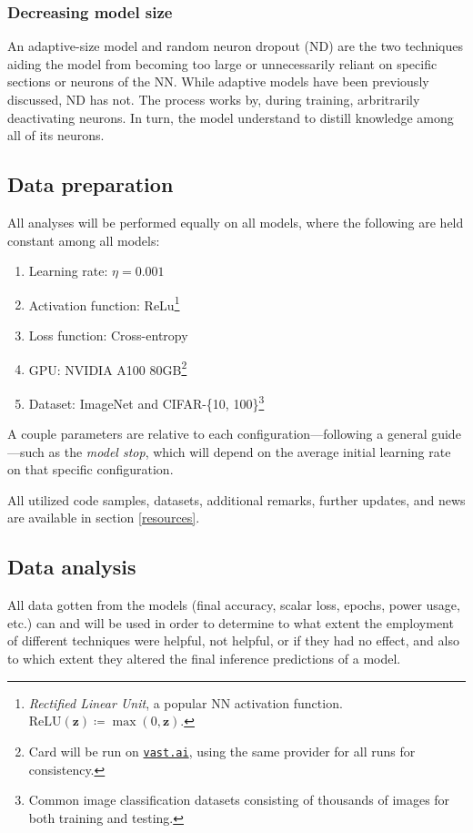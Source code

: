 \documentclass[conference]{IEEEtran}
\begin{document}
\subsubsection{Decreasing model size}
An adaptive-size model and random neuron dropout (ND) are the two techniques aiding the model from becoming too large or unnecessarily reliant on specific sections or neurons of the NN. While adaptive models have been previously discussed, ND has not. The process works by, during training, arbritrarily deactivating neurons. In turn, the model understand to distill knowledge among all of its neurons.

\subsection{Data preparation}

All analyses will be performed equally on all models, where the following are held constant among all models:

\begin{enumerate}
    \item Learning rate: $\eta=0.001$
    \item Activation function: ReLu\footnote{\textit{Rectified Linear Unit}, a popular NN activation function. $\text{ReLU}(\mathbf{z}) \coloneqq \max(0, \mathbf{z})$.}
    \item Loss function: Cross-entropy
    \item GPU: NVIDIA A100 80GB\footnote{Card will be run on \href{vast.ai}{\texttt{vast.ai}}, using the same provider for all runs for consistency.}
    \item Dataset: ImageNet and CIFAR-\{10, 100\}\footnote{Common image classification datasets consisting of thousands of images for both training and testing.}
\end{enumerate}

A couple parameters are relative to each configuration---following a general guide---such as the \textit{model stop}, which will depend on the average initial learning rate on that specific configuration.

All utilized code samples, datasets, additional remarks, further updates, and news are available in section \ref{resources}.

\subsection{Data analysis}
All data gotten from the models (final accuracy, scalar loss, epochs, power usage, etc.) can and will be used in order to determine to what extent the employment of different techniques were helpful, not helpful, or if they had no effect, and also to which extent they altered the final inference predictions of a model.
\end{document}
